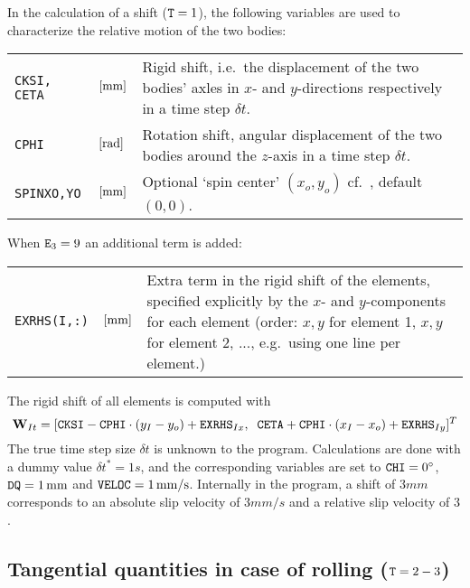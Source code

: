 \documentclass[12pt]{report}
\newenvironment{inputvars}{\vspace{0.4\baselineskip}%

\begin{tabular}{>{\raggedright}p{22mm}p{19mm}p{113mm}}}{
\end{tabular}

}
\newcommand{\inpvar}[3]{{\small\tt #1} & $#2$ & #3 \\[1ex]}
\begin{document}
In the calculation of a shift (${\tt T}=1$), the following variables are used
to characterize the relative motion of the two bodies:
\begin{inputvars}
\inpvar{CKSI, CETA}{\bunit{mm}}{Rigid shift, i.e.\ the displacement of the two
        bodies' axles in $x$- and $y$-directions respectively in a time
        step $\delta t$.}
\inpvar{CPHI}{\bunit{rad}}{Rotation shift, angular displacement of the two
        bodies around the $z$-axis in a time step $\delta t$.}
\inpvar{SPINXO,YO}{\bunit{mm}}{Optional `spin center' $(x_o,y_o)$ cf.\
        \cite{Vollebregt2018a-sdec}, default $(0,0)$.}
\end{inputvars}
When ${\tt E}_3=9$ an additional term is added:
\begin{inputvars}
\inpvar{EXRHS(I,:)}{\bunit{mm}}{Extra term in the rigid shift of the elements,
        specified explicitly by the $x$- and $y$-components for each
        element (order: $x,y$ for element 1, $x,y$ for element 2, ...,
        e.g.\ using one line per element.)}
\end{inputvars}
The rigid shift of all elements is computed with
\begin{equation}
    \vec{W}_{It} = [{\tt CKSI} - {\tt CPHI} \cdot (y_I-y_o) + 
                                                {\tt EXRHS}_{Ix},  \;\;
     {\tt CETA} + {\tt CPHI} \cdot (x_I-x_o) + {\tt EXRHS}_{Iy}  ]^T
\end{equation}
The true time step size $\delta t$ is unknown to the program. Calculations
are done with a dummy value $\delta t^*=1\unit{s}$, and the corresponding
variables are set to ${\tt CHI}=0^\circ$, ${\tt DQ}=1\unit{mm}$ and
${\tt VELOC}=1\unit{mm/s}$. Internally in the program, a shift of $3\unit{mm}$
corresponds to an absolute slip velocity of $3\unit{mm/s}$ and a relative
slip velocity of $3$.

\subsection{Tangential quantities in case of rolling \texorpdfstring{(${\tt
        T}=2-3$)}{}}
\label{sec:kincns_roll}
\end{document}
